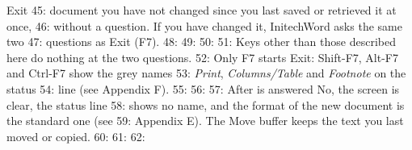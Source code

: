\begin{Feature}{Exit}
45: document you have not changed since you last saved or retrieved it at once,
46: without a question.  If you have changed it, InitechWord asks the same two
47: questions as Exit (F7).
48: 
49: 
50: 
51: Keys other than those described here do nothing at the two questions.
52: Only F7 starts Exit: Shift-F7, Alt-F7 and Ctrl-F7 show the grey names
53: \textit{Print}, \textit{Columns/Table} and \textit{Footnote} on the status
54: line (see Appendix F).
55: 
56: 
57: After  is answered No, the screen is clear, the status line
58: shows no name, and the format of the new document is the standard one (see
59: Appendix E).  The Move buffer keeps the text you last moved or copied.
60: 
61: 
62: \end{Feature}
